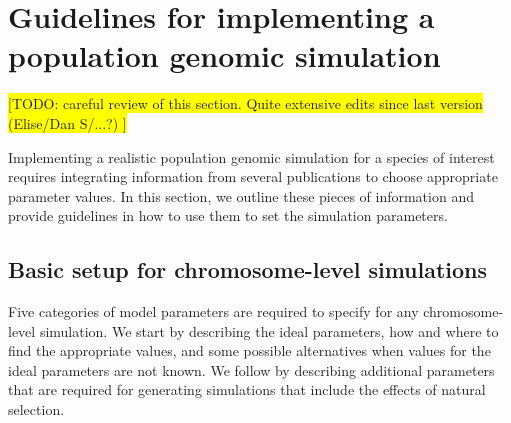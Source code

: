 \documentclass[hidelinks]{article}
\begin{document}
\hypertarget{sec3}{
\section*{Guidelines for implementing a population genomic simulation}\label{sec:sim-guidelines}}

\colorbox{yellow}{[TODO: careful review of this section. Quite extensive edits since last version (Elise/Dan S/...?) ]}\vspace{1em}


Implementing a realistic population genomic simulation for a species of interest
requires integrating information from several publications to choose appropriate parameter values. 
In this section, we outline these pieces of information and
provide guidelines in how to use them to set the simulation parameters.



\subsection*{Basic setup for chromosome-level simulations}

Five categories of model parameters are required to specify for any chromosome-level simulation.
We start by describing the ideal parameters, how and where to find the appropriate values, and some possible
alternatives when values for the ideal parameters are not known. We follow by describing
additional parameters that are required for generating simulations that include 
the effects of natural selection.
\end{document}
